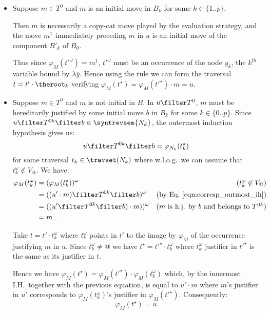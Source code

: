 \begin{itemize}[$\bullet$]
{\begin{enumerate}
\begin{itemize}
    \item Suppose $m\in T^0$ and $m$ is an initial move in $B_k$ for some $k\in \{1..p\}$.

    Then $m$ is necessarily a copy-cat move played by the evaluation strategy, and the move $m^1$ immediately preceding $m$ in $u$ is an initial move of the component $B'_k$ of $B_0$.

    Thus since $\varphi_M(t'^\omega) = m^1$, $t'^\omega$ must be an occurrence of the node $y_k$, the $k^{th}$ variable bound by $\lambda \overline{y}$. Hence using the rule  we can form the traversal $t= t' \cdot \theroot_k$ verifying $\varphi_M(t^\star) = \varphi_M(t'^\star) \cdot m = u$.


    \item Suppose $m\in T^0$ and $m$ is not initial in $B$. In $u \filter T^0$, $m$ must be hereditarily justified by some initial move $b$ in $B_k$ for some $k\in \{0..p\}$. Since $u \filter T^{0k} \filter b \in \syntrevsem{N_k}$, the outermost induction hypothesis gives us:
        \begin{equation}
        u \filter T^{0k} \filter b = \varphi_{N_k}(t_k^\star)  \label{eqn:corresp_outmost_ih}
        \end{equation}
        for some traversal $t_k \in \travset(N_k)$ where w.l.o.g.\ we can assume that $t_k^\omega \not\in V_@$. We have:
        \begin{align*}
            \varphi_M (t_k^\omega) &= (\varphi_M (t_k^\star))^\omega & \mbox{($t_k^\omega \not\in V_@$)}\\
                                   &= ((u' \cdot m) \filter T^{0k}\filter b)^\omega & \mbox{(by Eq.\ \ref{eqn:corresp_outmost_ih})}\\
                                   &= ((u' \filter T^{0k}\filter b) \cdot m))^\omega & \mbox{($m$ is h.j. by $b$ and belongs to $T^{0k}$)}\\
                                   &= m \ .
        \end{align*}

        Take $t = t'\cdot t_k^\omega$ where $t_k^\omega$ points in $t'$ to the image by $\varphi_M$ of the occurrence justifying $m$ in $u$. Since $t_k^\omega \neq @$ we have  $t^\star = t'^\star \cdot t_k^\omega$ where $t_k^\omega$ justifier in $t'^\star$ is the same as its justifier in $t$.


        Hence we have $\varphi_{M}(t^\star) =  \varphi_{M}(t'^\star)  \cdot \varphi_{M}(t_k^\omega)$ which, by the innermost I.H.\ together with the previous equation, is equal to $u' \cdot m$ where $m$'s justifier in $u'$ corresponds to $\varphi_{M}(t_k^\omega)$'s justifier in $\varphi_{M}(t'^\star)$. Consequently:
        \begin{equation}
                \varphi_M(t^\star) =  u  \label{eqn:corresp_phi_t_minu_at_eq_u}
        \end{equation}
\smallskip


\end{itemize}
\end{enumerate}}
\end{itemize}
